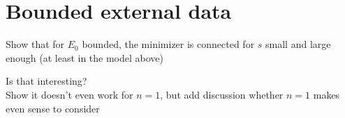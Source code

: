 \section{Bounded external data}
\label{sec:bounded_external_data}

\begin{TODO}
	Show that for \( E_0 \) bounded, the minimizer is connected for \( s \) small and
	large enough (at least in the model above)
\end{TODO}

\begin{TODO}
	Is that interesting?\\
	Show it doesn't even work for \( n = 1 \), but add discussion whether \( n = 1 \)
	makes even sense to consider
\end{TODO}
